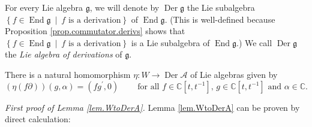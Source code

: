 \documentclass[etingof-lie.tex]{subfiles}
\begin{document}
\begin{definition}
For every Lie algebra $\mathfrak{g}$, we will denote by $\operatorname*{Der}%
\mathfrak{g}$ the Lie subalgebra $\left\{  f\in\operatorname*{End}%
\mathfrak{g}\ \mid\ f\text{ is a derivation}\right\}  $ of
$\operatorname*{End}\mathfrak{g}$. (This is well-defined because Proposition
\ref{prop.commutator.derivs} shows that $\left\{  f\in\operatorname*{End}%
\mathfrak{g}\ \mid\ f\text{ is a derivation}\right\}  $ is a Lie subalgebra of
$\operatorname*{End}\mathfrak{g}$.) We call $\operatorname*{Der}\mathfrak{g}$
the \textit{Lie algebra of derivations} of $\mathfrak{g}$.
\end{definition}

\begin{lemma}
\label{lem.WtoDerA}There is a natural homomorphism $\eta:W\rightarrow
\operatorname*{Der}\mathcal{A}$ of Lie algebras given by
\[
\left(  \eta\left(  f\partial\right)  \right)  \left(  g,\alpha\right)
=\left(  fg^{\prime},0\right)  \ \ \ \ \ \ \ \ \ \ \text{for all }%
f\in\mathbb{C}\left[  t,t^{-1}\right]  \text{, }g\in\mathbb{C}\left[
t,t^{-1}\right]  \text{ and }\alpha\in\mathbb{C}.
\]

\end{lemma}

\textit{First proof of Lemma \ref{lem.WtoDerA}.} Lemma \ref{lem.WtoDerA} can
be proven by direct calculation:
\end{document}
